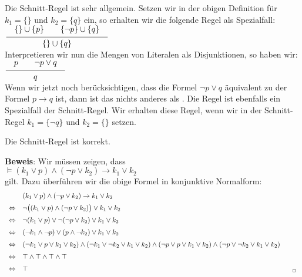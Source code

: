 \noindent
Die Schnitt-Regel ist sehr allgemein.  Setzen wir in der obigen Definition für $k_1 = \{\}$ und  $k_2 = \{q\}$ 
ein, so erhalten wir die folgende Regel als Spezialfall: \\[0.2cm]
\hspace*{1.3cm} $\schluss{\{\} \cup \{p\} \quad\quad \{\neg p\} \cup \{ q \} }{ \{\} \cup \{q\} }$ \\[0.2cm]
Interpretieren wir nun die Mengen von Literalen als Disjunktionen, so haben wir: \\[0.2cm]
\hspace*{1.3cm}  $\schluss{p \quad\quad \neg p \vee q }{ q }$ \\[0.2cm]
Wenn wir jetzt noch berücksichtigen, dass die Formel $\neg p \vee q$ äquivalent zu der
Formel $p \rightarrow q$ ist, dann ist das nichts anderes als .  
Die Regel  ist ebenfalls ein Spezialfall der Schnitt-Regel.  Wir
erhalten diese Regel, wenn wir in der Schnitt-Regel $k_1 = \{ \neg q \}$ und $k_2 = \{\}$ setzen.

\begin{Satz}
  Die Schnitt-Regel ist korrekt.
\end{Satz}
\textbf{Beweis}:  Wir müssen zeigen, dass
\\[0.2cm]
\hspace*{1.3cm}
$\models (k_1 \vee p) \wedge (\neg p \vee k_2) \rightarrow k_1 \vee k_2$
\\[0.2cm]
gilt.  Dazu überführen wir die obige Formel in konjunktive Normalform:
$$
\begin{array}{ll}
  & (k_1 \vee p) \wedge (\neg p \vee k_2) \rightarrow k_1 \vee k_2  \\[0.2cm]
\Leftrightarrow  & 
    \neg \bigl( (k_1 \vee p) \wedge (\neg p \vee k_2) \bigr) \vee k_1 \vee k_2 \\[0.2cm]
\Leftrightarrow  & 
    \neg (k_1 \vee p) \vee \neg (\neg p \vee k_2) \vee k_1 \vee k_2 \\[0.2cm]
\Leftrightarrow  & 
     (\neg k_1 \wedge \neg p) \vee  (p \wedge \neg k_2) \vee k_1 \vee k_2 \\[0.2cm]
\Leftrightarrow  & 
     (\neg k_1 \vee p \vee k_1 \vee k_2)  \wedge 
     (\neg k_1 \vee \neg k_2 \vee k_1 \vee k_2)  \wedge 
     (\neg p \vee p \vee k_1 \vee k_2)  \wedge 
     (\neg p \vee \neg k_2 \vee k_1 \vee k_2) 
      \\[0.2cm]
\Leftrightarrow  & 
     \verum  \wedge 
     \verum  \wedge 
     \verum  \wedge 
     \verum 
      \\[0.2cm]
\Leftrightarrow  & 
     \verum    \hspace*{13.5cm} _\Box
      \\
\end{array}
$$



